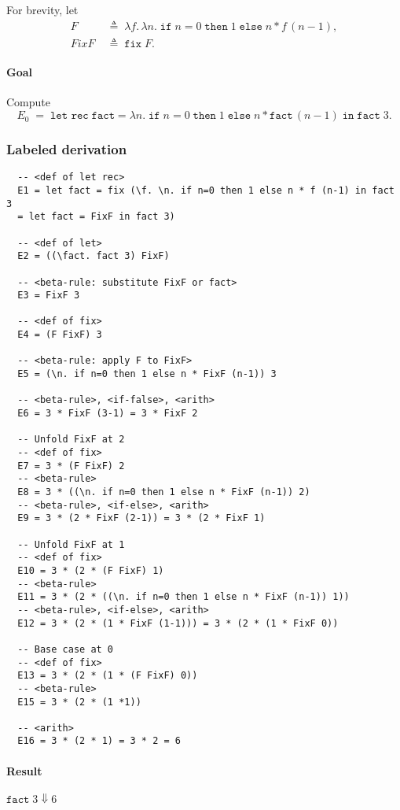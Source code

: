 \documentclass{article}
\theoremstyle{theorem}
\theoremstyle{definition}
\theoremstyle{remark}
\begin{document}
For brevity, let
\[
\begin{aligned}
F &\;\triangleq\; \lambda f.\,\lambda n.\;\texttt{if}\;n=0\;\texttt{then}\;1\;\texttt{else}\;n * f\,(n-1),\\
\textit{FixF} &\;\triangleq\; \texttt{fix}\;F.
\end{aligned}
\]

\paragraph{Goal} Compute
\[
E_0 \;=\; \texttt{let rec}\;\texttt{fact} = \lambda n.\;\texttt{if}\;n=0\;\texttt{then}\;1\;\texttt{else}\;n * \texttt{fact}\,(n-1)\;\texttt{in}\;\texttt{fact}\;3.
\]

\subsubsection*{Labeled derivation}

\begin{lstlisting}
  -- <def of let rec>
  E1 = let fact = fix (\f. \n. if n=0 then 1 else n * f (n-1) in fact 3
  = let fact = FixF in fact 3)
  
  -- <def of let>
  E2 = ((\fact. fact 3) FixF)

  -- <beta-rule: substitute FixF or fact>
  E3 = FixF 3

  -- <def of fix>
  E4 = (F FixF) 3

  -- <beta-rule: apply F to FixF>
  E5 = (\n. if n=0 then 1 else n * FixF (n-1)) 3

  -- <beta-rule>, <if-false>, <arith>
  E6 = 3 * FixF (3-1) = 3 * FixF 2

  -- Unfold FixF at 2
  -- <def of fix>
  E7 = 3 * (F FixF) 2
  -- <beta-rule>
  E8 = 3 * ((\n. if n=0 then 1 else n * FixF (n-1)) 2)
  -- <beta-rule>, <if-else>, <arith>
  E9 = 3 * (2 * FixF (2-1)) = 3 * (2 * FixF 1)
  
  -- Unfold FixF at 1
  -- <def of fix>
  E10 = 3 * (2 * (F FixF) 1)
  -- <beta-rule>
  E11 = 3 * (2 * ((\n. if n=0 then 1 else n * FixF (n-1)) 1))
  -- <beta-rule>, <if-else>, <arith>
  E12 = 3 * (2 * (1 * FixF (1-1))) = 3 * (2 * (1 * FixF 0))

  -- Base case at 0
  -- <def of fix>
  E13 = 3 * (2 * (1 * (F FixF) 0))
  -- <beta-rule>
  E15 = 3 * (2 * (1 *1))

  -- <arith>
  E16 = 3 * (2 * 1) = 3 * 2 = 6
\end{lstlisting}

\paragraph{Result} \(\texttt{fact}\;3 \Downarrow 6\)
\end{document}
